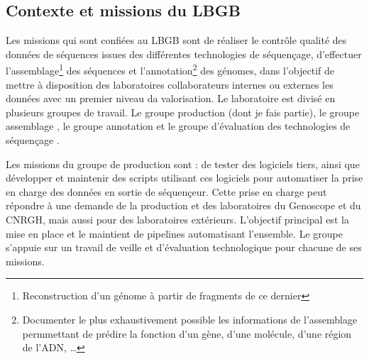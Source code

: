 \subsection{Contexte et missions du LBGB}
Les missions qui sont confiées au LBGB sont de réaliser le contrôle qualité des données de séquences issues des différentes technologies de séquençage, d'effectuer l'assemblage\footnote{Reconstruction d'un génome à partir de fragments de ce dernier} des séquences et l'annotation\footnote{Documenter le plus exhaustivement possible les informations de l'assemblage permmettant de prédire la fonction d'un gène, d'une molécule, d'une région de l'ADN, \dots} des génomes, dans l'objectif de mettre à disposition des laboratoires collaborateurs internes ou externes les données avec un premier niveau da valorisation. Le laboratoire est divisé en plusieurs groupes de travail. Le groupe \og production \fg{} (dont je fais partie), le groupe \og assemblage \fg{}, le groupe \og annotation \fg{} et le groupe \og d'évaluation des technologies de séquençage \fg{}.

Les missions du groupe de \og production \fg{} sont : de tester des logiciels tiers, ainsi que développer et maintenir des scripts utilisant ces logiciels pour automatiser la prise en charge des données en sortie de séquençeur. Cette prise en charge peut répondre à une demande de la production et des laboratoires du Genoscope et du CNRGH, mais aussi pour des laboratoires extérieurs. L'objectif principal est la mise en place et le maintient de pipelines automatisant l'ensemble. Le groupe s'appuie sur un travail de veille et d'évaluation technologique pour chacune de ses missions. 


